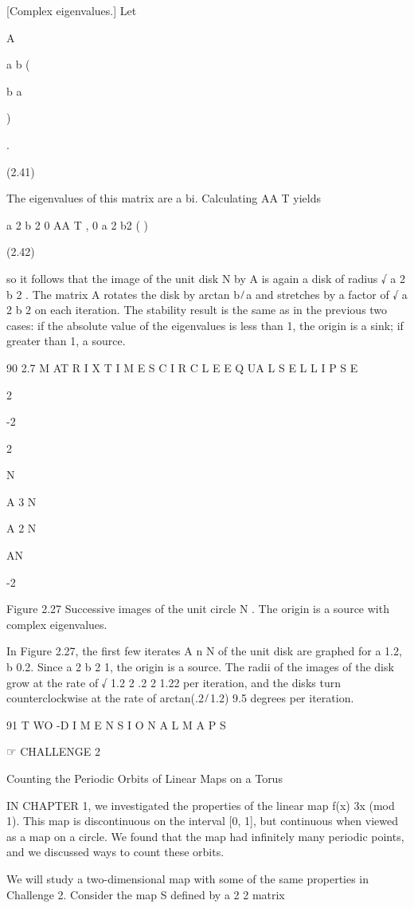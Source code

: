 \documentclass[12pt]{article}
\begin{document}
[Complex eigenvalues.] Let

A

a b (

b a

)

.

(2.41)

The eigenvalues of this matrix are a  bi. Calculating AA T yields

a 2  b 2 0 AA T  , 0 a 2  b2  ( )

(2.42)

so it follows that the image of the unit disk N by A is again a disk of radius √ a 2  b 2 . The matrix A rotates the disk by arctan 
b ̸ a and stretches by a factor of √ a 2  b 2 on each iteration. The stability result is the same as in the previous two cases: if 
the absolute value of the eigenvalues is less than 1, the origin is a sink; if greater than 1, a source.

90 2.7 M AT R I X T I M E S C I R C L E E Q UA L S E L L I P S E

2

-2

2

N

A 3 N

A 2 N

AN

-2

Figure 2.27 Successive images of the unit circle N . The origin is a source with complex eigenvalues.

In Figure 2.27, the ﬁrst few iterates A n N of the unit disk are graphed for a  1.2, b  0.2. Since a 2  b 2  1, the origin is a 
source. The radii of the images of the disk grow at the rate of √ 1.2 2  .2 2  1.22 per iteration, and the disks turn 
counterclockwise at the rate of arctan(.2 ̸ 1.2)  9.5 degrees per iteration.

91 T WO -D I M E N S I O N A L M A P S

☞ CHALLENGE 2

Counting the Periodic Orbits of Linear Maps on a Torus

IN CHAPTER 1, we investigated the properties of the linear map f(x)  3x (mod 1). This map is discontinuous on the interval [0, 1], 
but continuous when viewed as a map on a circle. We found that the map had inﬁnitely many periodic points, and we discussed ways to 
count these orbits.

We will study a two-dimensional map with some of the same properties in Challenge 2. Consider the map S deﬁned by a 2 2 matrix
\end{document}
